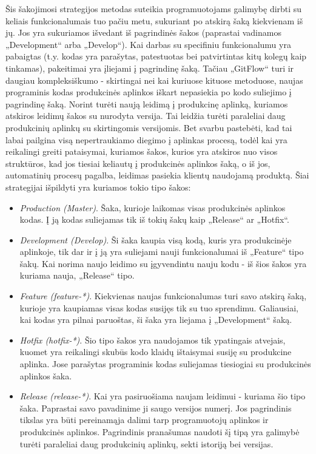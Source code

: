 \documentclass{VUMIFPSkursinis}
\begin{document}

Šis šakojimosi strategijos metodas suteikia programuotojams galimybę dirbti su keliais funkcionalumais tuo pačiu metu, sukuriant po atskirą šaką kiekvienam iš jų. Jos yra sukuriamos išvedant iš pagrindinės šakos (paprastai vadinamos „Development“ arba „Develop“). Kai darbas su specifiniu funkcionalumu yra pabaigtas (t.y. kodas yra parašytas, patestuotas bei patvirtintas kitų kolegų kaip tinkamas), pakeitimai yra įliejami į pagrindinę šaką. Tačiau „GitFlow“ turi ir daugiau kompleksiškumo - skirtingai nei kai kuriuose kituose metoduose, naujas programinis kodas produkcinės aplinkos iškart nepasiekia po kodo suliejimo į pagrindinę šaką. Norint turėti naują leidimą į produkcinę aplinką,  kuriamos atskiros leidimų šakos su nurodyta versija. Tai leidžia turėti paraleliai daug produkcinių aplinkų su skirtingomis versijomis. Bet svarbu pastebėti, kad tai labai pailgina visą nepertraukiamo diegimo į aplinkas procesą, todėl kai yra reikalingi greiti pataisymai, kuriamos šakos, kurios yra atskiros nuo visos struktūros, kad jos tiesiai keliautų į produkcinės aplinkos šaką, o iš jos, automatinių procesų pagalba, leidimas pasiekia klientų naudojamą produktą. Šiai strategijai išpildyti yra kuriamos tokio tipo šakos:

\begin{itemize}
  \item \textit{Production (Master)}. Šaka, kurioje laikomas visas produkcinės aplinkos kodas. Į ją kodas suliejamas tik iš tokių šakų kaip „Release“ ar „Hotfix“.
  
  \item \textit{Development (Develop)}. Ši šaka kaupia visą kodą, kuris yra produkcinėje aplinkoje, tik dar ir į ją yra suliejami nauji funkcionalumai iš „Feature“ tipo šakų. Kai norima naujo leidimo su įgyvendintu nauju kodu - iš šios šakos yra kuriama nauja, „Release“ tipo.

  \item \textit{Feature (feature-*)}. Kiekvienas naujas funkcionalumas turi savo atskirą šaką, kurioje yra kaupiamas visas kodas susijęs tik su tuo sprendimu. Galiausiai, kai kodas yra pilnai paruoštas, ši šaka yra liejama į „Development“ šaką.

  \item \textit{Hotfix (hotfix-*)}. Šio tipo šakos yra naudojamos tik ypatingais atvejais, kuomet yra reikalingi skubūs kodo klaidų ištaisymai susiję su produkcine aplinka. Jose parašytas programinis kodas suliejamas tiesiogiai su produkcinės aplinkos šaka.

  
  \item \textit{Release (release-*)}. Kai yra pasiruošiama naujam leidimui - kuriama šio tipo šaka. Paprastai savo pavadinime ji saugo versijos numerį. Jos pagrindinis tikslas yra būti pereinamąja dalimi tarp programuotojų aplinkos ir produkcinės aplinkos. Pagrindinis pranašumas naudoti šį tipą yra galimybė turėti paraleliai daug produkcinių aplinkų, sekti istoriją bei versijas.
\end{itemize}
\end{document}
